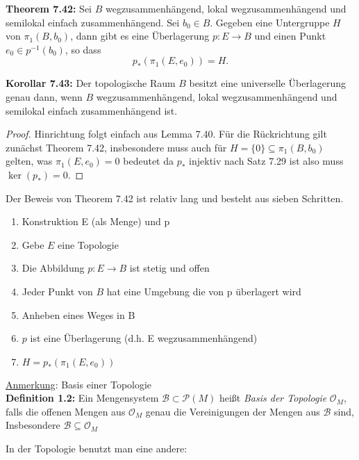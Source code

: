 \documentclass[fleqn, 12pt, letterpaper]{article}
\begin{document}
\medskip


\textbf{Theorem 7.42:} Sei \( B \) wegzusammenhängend, lokal wegzusammenhängend und semilokal einfach zusammenhängend. Sei \( b_0 \in B \). Gegeben eine Untergruppe \( H \) von \( \pi_1(B, b_0) \), dann gibt es eine Überlagerung \( p : E \to B \) und einen Punkt \( e_0 \in p^{-1}(b_0) \), so dass
\[
  p_*(\pi_1(E, e_0)) = H.
\]

\medskip

\textbf{Korollar 7.43:} Der topologische Raum \( B \) besitzt eine universelle Überlagerung genau dann, wenn \( B \) wegzusammenhängend, lokal wegzusammenhängend und semilokal einfach zusammenhängend ist.
\begin{proof}
    Hinrichtung folgt einfach aus Lemma 7.40. Für die Rückrichtung gilt zunächst Theorem 7.42, insbesondere muss auch für $H=\{0\}\subseteq\pi_1(B,b_0)$ gelten, was $\pi_1(E,e_0)=0$ bedeutet da $p_*$ injektiv nach Satz 7.29 ist also muss $\ker(p_*)=0$.
\end{proof}

\medskip

Der Beweis von Theorem 7.42 ist relativ lang und besteht aus sieben Schritten.
\begin{enumerate}
  \item Konstruktion E (als Menge) und p
  \item Gebe \( E \) eine Topologie
  \item Die Abbildung \( p : E \to B \) ist stetig und offen
  \item Jeder Punkt von \( B \) hat eine Umgebung die von p überlagert wird
  \item Anheben eines Weges in B
  \item \( p \) ist eine Überlagerung (d.h. E wegzusammenhängend)
  \item $H=p_*(\pi_1(E,e_0))$
\end{enumerate}
\underline{Anmerkung}: Basis einer Topologie\\

\textbf{Definition 1.2:}
Ein Mengensystem \( \mathcal{B} \subset \mathcal{P}(M) \) heißt \emph{Basis der Topologie} \( \mathcal{O}_M \), falls die offenen Mengen aus \( \mathcal{O}_M \) genau die Vereinigungen der Mengen aus \( \mathcal{B} \) sind,  
Insbesondere \( \mathcal{B} \subseteq\mathcal{O}_M \)

\medskip

In der Topologie benutzt man eine andere:

\medskip 
\end{document}
